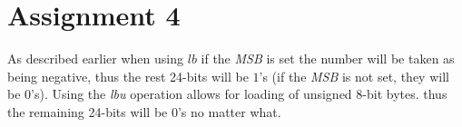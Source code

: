 \section{Assignment 4}
As described earlier when using $lb$ if the \emph{MSB} is set the number will be
taken as being negative, thus the rest 24-bits will be $1$'s (if the \emph{MSB}
is not set, they will be $0$'s). Using the \emph{lbu} operation allows for
loading of unsigned 8-bit bytes. thus the remaining 24-bits will be $0$'s no
matter what.
